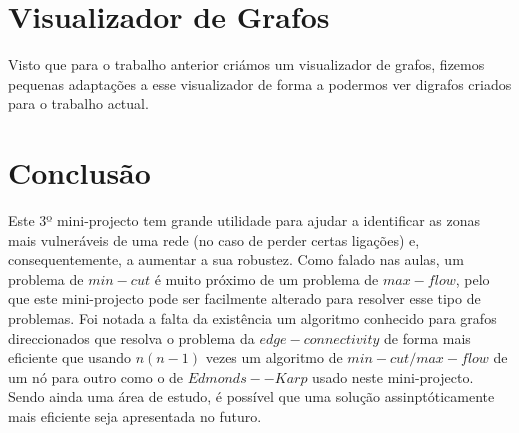 \documentclass[10pt,a4paper]{article}
\begin{document}
\section{Visualizador de Grafos}
Visto que para o trabalho anterior criámos um visualizador de grafos, fizemos pequenas adaptações a esse visualizador de forma a podermos ver digrafos criados para o trabalho actual.

\section{Conclusão}
Este 3º mini-projecto tem grande utilidade para ajudar a identificar as zonas mais vulneráveis de uma rede (no caso de perder certas ligações) e, consequentemente, a aumentar a sua robustez. Como falado nas aulas, um problema de $min-cut$ é muito próximo de um problema de $max-flow$, pelo que este mini-projecto pode ser facilmente alterado para resolver esse tipo de problemas. Foi notada a falta da existência um algoritmo conhecido para grafos direccionados que resolva o problema da $edge-connectivity$ de forma mais eficiente que usando $n(n-1)$ vezes um algoritmo de $min-cut/max-flow$  de um nó para outro como o de $Edmonds--Karp$ usado neste mini-projecto. Sendo ainda uma área de estudo, é possível que uma solução assinptóticamente mais eficiente seja apresentada no futuro.


\nocite{slidesADRC}
\end{document}
